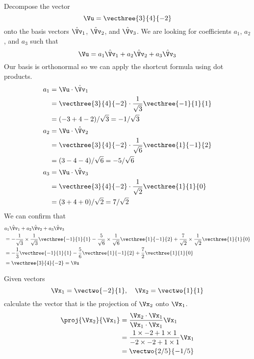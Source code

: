 \documentclass[12pt,ragged]{pajarticle}
\begin{document}
\begin{question}{9}{%
Decompose the vector
\[ \Vu = \vecthree{3}{4}{-2} \]
onto the basis vectors $\hat{\Vv}_1$, $\hat{\Vv}_2$, and $\hat{\Vv}_3$.}{
We are looking for coefficients $a_1$, $a_2$, and $a_3$ such that
\[ \Vu = a_1\hat{\Vv}_1 + a_2\hat{\Vv}_2 + a_3\hat{\Vv}_3 \]
Our basis is orthonormal so we can apply the shortcut formula using dot products.
\begin{align*}
	a_1 &= \Vu\cdot\hat{\Vv}_1 \\
		&= \vecthree{3}{4}{-2}\cdot \frac{1}{\sqrt{3}}\vecthree{-1}{1}{1} \\
		&= (-3 + 4 - 2)/\sqrt{3} = -1/\sqrt{3} \\
	a_2 &= \Vu\cdot\hat{\Vv}_2 \\
		&= \vecthree{3}{4}{-2}\cdot \frac{1}{\sqrt{6}}\vecthree{1}{-1}{2} \\
		&= (3 - 4 - 4)/\sqrt{6} = -5/\sqrt{6} \\
	a_3 &= \Vu\cdot\hat{\Vv}_3 \\
		&= \vecthree{3}{4}{-2}\cdot \frac{1}{\sqrt{2}}\vecthree{1}{1}{0} \\
		&= (3 + 4 + 0)/\sqrt{2} = 7/\sqrt{2} \\
\end{align*}
We can confirm that
\begin{align*}
	&a_1\hat{\Vv}_1 + a_2\hat{\Vv}_2 + a_3\hat{\Vv}_3 \\
	&= -\frac{1}{\sqrt{3}} \times \frac{1}{\sqrt{3}} \vecthree{-1}{1}{1}   
		- \frac{5}{\sqrt{6}} \times \frac{1}{\sqrt{6}} \vecthree{1}{-1}{2} 
		+ \frac{7}{\sqrt{2}}\times\frac{1}{\sqrt{2}} \vecthree{1}{1}{0} \\
	&= 	-\frac{1}{3}\vecthree{-1}{1}{1} - \frac{5}{6}\vecthree{1}{-1}{2} + \frac{7}{2}\vecthree{1}{1}{0} \\
	&= \vecthree{3}{4}{-2} = \Vu
\end{align*}
}	
\end{question}

\begin{question}{10}{%
Given vectors
\[ \Vx_1 = \vectwo{-2}{1},\quad \Vx_2 = \vectwo{1}{1} \]
calculate the vector that is the projection of $\Vx_2$ onto $\Vx_1$.}{
\begin{align*}
	\proj{\Vx_2}{\Vx_1} &= \frac{\Vx_2\cdot\Vx_1	}{\Vx_1\cdot\Vx_1}\Vx_1 \\
	&= \frac{1\times-2 + 1\times1}{-2\times-2 + 1\times1}\Vx_1 \\
	&= \vectwo{2/5}{-1/5}
\end{align*}
}	
\end{question}
\end{document}
